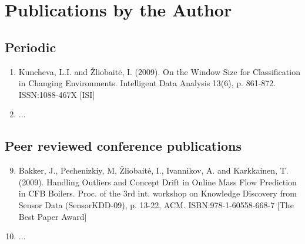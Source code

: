 	

\chapter*{Publications by the Author}
\label{cha:publications} 


\section*{Periodic}

\begin{enumerate}
\item Kuncheva, L.I. and \v{Z}liobait\.e, I. (2009). On the Window Size for Classification in Changing Environments. Intelligent Data Analysis 13(6), p. 861-872. ISSN:1088-467X  [ISI]
\item ... 
\end{enumerate}

\section*{Peer reviewed conference publications}
\begin{enumerate}
\setcounter{enumi}{8}
\item Bakker, J., Pechenizkiy, M, \v{Z}liobait\.e, I., Ivannikov, A. and Karkkainen, T. (2009). Handling Outliers and Concept Drift in Online Mass Flow Prediction in CFB Boilers. Proc. of the 3rd int. workshop on Knowledge Discovery from Sensor Data (SensorKDD-09), p. 13-22, ACM. ISBN:978-1-60558-668-7 [The Best Paper Award]
\item ...
\end{enumerate}